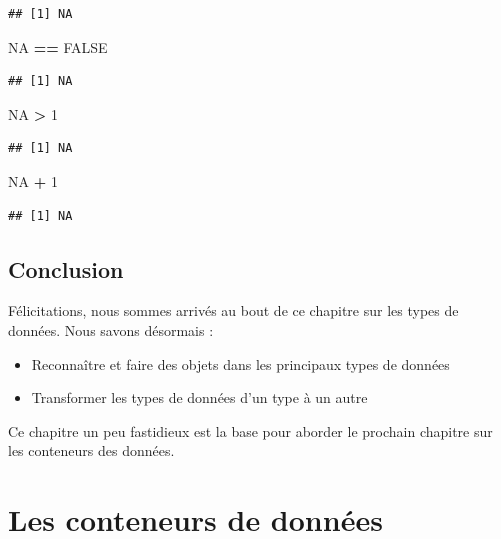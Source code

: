 \documentclass[
]{book}
\newenvironment{Shaded}{\begin{snugshade}}{\end{snugshade}}
\newcommand{\DecValTok}[1]{\textcolor[rgb]{0.00,0.00,0.81}{#1}}
\newcommand{\OperatorTok}[1]{\textcolor[rgb]{0.81,0.36,0.00}{\textbf{#1}}}
\newcommand{\OtherTok}[1]{\textcolor[rgb]{0.56,0.35,0.01}{#1}}
\newcommand{\StringTok}[1]{\textcolor[rgb]{0.31,0.60,0.02}{#1}}
\providecommand{\tightlist}{%
  \setlength{\itemsep}{0pt}\setlength{\parskip}{0pt}}
\begin{document}
\begin{verbatim}
## [1] NA
\end{verbatim}

\begin{Shaded}
\begin{Highlighting}[]
\OtherTok{NA} \OperatorTok{==}\StringTok{ }\OtherTok{FALSE}
\end{Highlighting}
\end{Shaded}

\begin{verbatim}
## [1] NA
\end{verbatim}

\begin{Shaded}
\begin{Highlighting}[]
\OtherTok{NA} \OperatorTok{>}\StringTok{ }\DecValTok{1}
\end{Highlighting}
\end{Shaded}

\begin{verbatim}
## [1] NA
\end{verbatim}

\begin{Shaded}
\begin{Highlighting}[]
\OtherTok{NA} \OperatorTok{+}\StringTok{ }\DecValTok{1}
\end{Highlighting}
\end{Shaded}

\begin{verbatim}
## [1] NA
\end{verbatim}

\hypertarget{conclusion-2}{%
\section{Conclusion}\label{conclusion-2}}

Félicitations, nous sommes arrivés au bout de ce chapitre sur les types de données. Nous savons désormais :

\begin{itemize}
\tightlist
\item
  Reconnaître et faire des objets dans les principaux types de données
\item
  Transformer les types de données d'un type à un autre
\end{itemize}

Ce chapitre un peu fastidieux est la base pour aborder le prochain chapitre sur les conteneurs des données.

\hypertarget{dataType2}{%
\chapter{Les conteneurs de données}\label{dataType2}}
\end{document}
